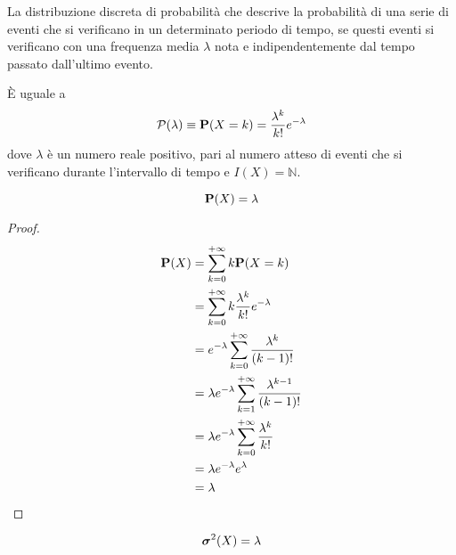 \begin{definition}
  \label{def:distribuzione_di_poisson}
  La distribuzione discreta di probabilità che descrive la probabilità di una serie di eventi che si verificano in un determinato periodo di tempo, se questi eventi si verificano con una frequenza media \( \lambda \) nota e indipendentemente dal tempo passato dall'ultimo evento.

  È uguale a
  \[ \mathcal{P}(\lambda) \equiv \mathbf{P}(X = k) = \frac{\lambda^k}{k!} e^{- \lambda} \]
  dove \( \lambda \) è un numero reale positivo, pari al numero atteso di eventi che si verificano durante l'intervallo di tempo e \( I(X) = \mathbb{N} \).
\end{definition}

\begin{proposition}
  \label{pro:previsione_distribuzione_di_poisson}
  \[ \mathbf{P}(X) = \lambda \]
\end{proposition}

\begin{proof}
  \begin{align*}
    \mathbf{P}(X) &= \sum_{k=0}^{+ \infty} k \mathbf{P}(X = k) \\
    &= \sum_{k=0}^{+ \infty} k \frac{\lambda^k}{k!} e^{- \lambda} \\
    &= e^{- \lambda} \sum_{k=0}^{+ \infty} \frac{\lambda^k}{(k-1)!} \\
    &= \lambda e^{- \lambda} \sum_{k=1}^{+ \infty} \frac{\lambda^{k-1}}{(k-1)!} \\
    &= \lambda e^{- \lambda} \sum_{k=0}^{+ \infty} \frac{\lambda^{k}}{k!} \\
    &= \lambda e^{- \lambda} e^\lambda \\
    &= \lambda
  \end{align*}
\end{proof}

\begin{proposition}
  \label{pro:varianza_distribuzione_di_poisson}
  \[ \boldsymbol\sigma^2(X) = \lambda \]
\end{proposition}

